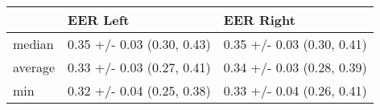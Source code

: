 \begin{tabular}{lll}
\toprule
{} &                    EER Left &                   EER Right \\
\midrule
median  &  0.35 +/- 0.03 (0.30, 0.43) &  0.35 +/- 0.03 (0.30, 0.41) \\
average &  0.33 +/- 0.03 (0.27, 0.41) &  0.34 +/- 0.03 (0.28, 0.39) \\
min     &  0.32 +/- 0.04 (0.25, 0.38) &  0.33 +/- 0.04 (0.26, 0.41) \\
\bottomrule
\end{tabular}
